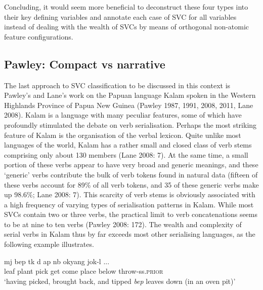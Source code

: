 Concluding, it would seem more beneficial to deconstruct these four types into their key defining variables and annotate each case of SVC for all variables instead of dealing with the wealth of SVCs by means of orthogonal non-atomic feature configurations. 

\subsection{Pawley: Compact vs narrative}

The last approach to SVC classification to be discussed in this context is Pawley's and Lane's work on the Papuan language Kalam spoken in the Western Highlands Province of Papua New Guinea (Pawley 1987, 1991, 2008, 2011, Lane 2008). Kalam is a language with many peculiar features, some of which have profoundly stimulated the debate on verb serialisation. Perhaps the most striking feature of Kalam is the organisation of the verbal lexicon. Quite unlike most languages of the world, Kalam has a rather small and closed class of verb stems comprising only about 130 members (Lane 2008: 7). At the same time, a small portion of these verbs appear to have very broad and generic meanings, and these `generic' verbs contribute the bulk of verb tokens found in natural data (fifteen of these verbs account for 89\% of all verb tokens, and 35 of these generic verbs make up 98.6\%; Lane 2008: 7). This scarcity of verb stems is obviously associated with a high frequency of varying types of serialisation patterns in Kalam. While most SVCs contain two or three verbs, the practical limit to verb concatenations seems to be at nine to ten verbs (Pawley 2008: 172). The wealth and complexity of serial verbs in Kalam thus by far exceeds most other serialising languages, as the following example illustrates.

\ea \label{kalam1}
\gll mj bep tk d ap nb okyang jok-l ... \\
leaf plant pick get come place below throw-\acs{ss}.\textsc{prior} \\
\glft `having picked, brought back, and tipped \textit{bep} leaves down (in an oven pit)' \\ 
\z
\xe

